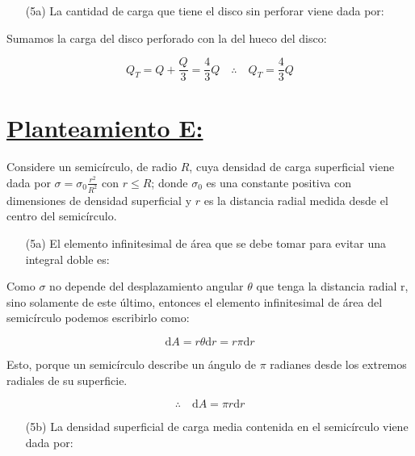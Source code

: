\documentclass[a4paper,10pt]{article}
\begin{document}
\begin{itemize}
    \item[(5a)]La cantidad de carga que tiene el disco sin perforar viene dada por:
\end{itemize}

Sumamos la carga del disco perforado con la del hueco del disco:

\begin{equation*}
    Q_{T}=Q+\frac{Q}{3}=\frac{4}{3}Q\quad\therefore\quad
    \boxed{Q_{T}=\frac{4}{3}Q}
\end{equation*}        

\section*{\underline{Planteamiento E:}}

Considere un semicírculo, de radio $R$, cuya densidad de carga superficial viene
dada por $\sigma=\sigma_{0}\frac{r^2}{R^2}$ con $r \leq R$; donde $\sigma_{0}$ es
una constante positiva con dimensiones de densidad
superficial y $r$ es la distancia radial medida desde el centro del semicírculo.

\begin{itemize}
    \item[(5a)] El elemento infinitesimal de área que se debe tomar para evitar una integral doble es:
\end{itemize}

Como $\sigma$ no depende del desplazamiento angular $\theta$ que tenga la
distancia radial r, sino solamente de este \'ultimo, entonces el
elemento infinitesimal de \'area del semic\'irculo podemos escribirlo como:

\begin{equation*}
    \mathrm{d}A=r\theta\mathrm{d}r=r\pi\mathrm{d}r
\end{equation*}

Esto, porque un semic\'irculo describe un \'angulo de $\pi$ radianes desde los
extremos radiales de su superficie.

\begin{equation*}
    \therefore\quad \boxed{\mathrm{d}A=\pi r\mathrm{d}r}
\end{equation*}

\begin{itemize}
    \item[(5b)] La densidad superficial de carga media contenida en el semicírculo viene dada por:
\end{itemize}
\end{document}
